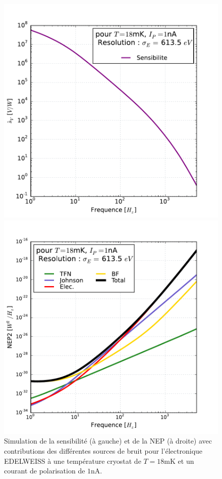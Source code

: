 \begin{figure}[!ht]
\begin{minipage}{0.49\textwidth}
\includegraphics[width=\textwidth]{Images/sv_fin.pdf}
\end{minipage}
\hfill
\begin{minipage}{0.49\textwidth}
\includegraphics[width=\textwidth]{Images/nep_fin.pdf}
\end{minipage}
\caption{Simulation de la sensibilité (à gauche) et de la NEP (à droite) avec contributions des différentes sources de bruit pour l'électronique EDELWEISS à une température cryostat de $T=18$mK et un courant de polarisation de $1$nA.}
\label{nep-fig}
\end{figure}

